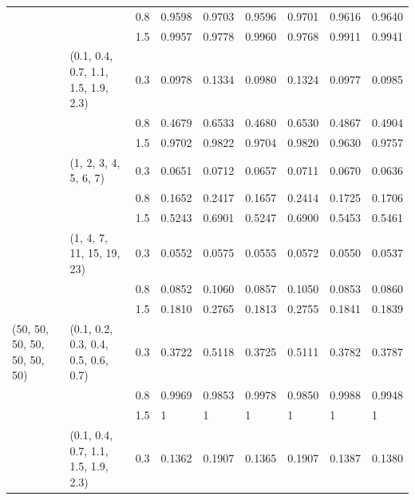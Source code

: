 \begin{table}[h]
\begin{tabular}{lllllllll}
                             			&                                     			& 0.8   	& 0.9598 	& 0.9703 	& 0.9596 	& 0.9701 	& 0.9616 	& 0.9640 \\
                             			&                                     			& 1.5   	& 0.9957 	& 0.9778 	& 0.9960 	& 0.9768 	& 0.9911 	& 0.9941 \\
                             			& (0.1, 0.4, 0.7, 1.1, 1.5, 1.9, 2.3) 	& 0.3   	& 0.0978 	& 0.1334 	& 0.0980 	& 0.1324 	& 0.0977 	& 0.0985 \\
                             			&                                     			& 0.8   	& 0.4679 	& 0.6533 	& 0.4680 	& 0.6530 	& 0.4867 	& 0.4904 \\
                             			&                                     			& 1.5   	& 0.9702 	& 0.9822 	& 0.9704 	& 0.9820 	& 0.9630 	& 0.9757 \\
                            			& (1, 2, 3, 4, 5, 6, 7)               		& 0.3   	& 0.0651 	& 0.0712 	& 0.0657 	& 0.0711 	& 0.0670 	& 0.0636 \\
                             			&                                     			& 0.8   	& 0.1652 	& 0.2417 	& 0.1657 	& 0.2414 	& 0.1725 	& 0.1706 \\
                             			&                                    			& 1.5   	& 0.5243 	& 0.6901 	& 0.5247 	& 0.6900 	& 0.5453 	& 0.5461 \\
                             			& (1, 4, 7, 11, 15, 19, 23)           		& 0.3   	& 0.0552 	& 0.0575 	& 0.0555 	& 0.0572 	& 0.0550 	& 0.0537 \\
                             			&                                     			& 0.8   	& 0.0852 	& 0.1060 	& 0.0857 	& 0.1050 	& 0.0853 	& 0.0860 \\
                             			&                                     			& 1.5   	& 0.1810 	& 0.2765 	& 0.1813 	& 0.2755 	& 0.1841 	& 0.1839 \\\hline
(50, 50, 50, 50, 50, 50, 50) 	& (0.1, 0.2, 0.3, 0.4, 0.5, 0.6, 0.7) 	& 0.3   	& 0.3722 	& 0.5118 	& 0.3725 	& 0.5111 	& 0.3782 	& 0.3787 \\
                             			&                                     			& 0.8   	& 0.9969 	& 0.9853 	& 0.9978 	& 0.9850 	& 0.9988 	& 0.9948 \\
                             			&                                     			& 1.5   	& 1	 	& 1	 	& 1	 	& 1	 	& 1	 	& 1		\\
                             			& (0.1, 0.4, 0.7, 1.1, 1.5, 1.9, 2.3) 	& 0.3   	& 0.1362 	& 0.1907 	& 0.1365 	& 0.1907 	& 0.1387 	& 0.1380 \\

\end{tabular}
\end{table}
